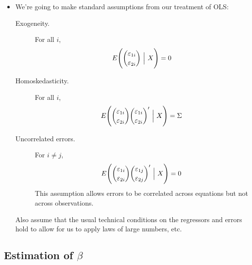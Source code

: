 \begin{itemize}[leftmargin=0pt]
\item We're going to make standard assumptions from our treatment of
  OLS:
  \begin{description}
  \item[Exogeneity.] For all $i$,
    \begin{equation*}
      E\Bigg(\binom{\vep_{1i}}{\vep_{2i}} \ \Big|\ X\Bigg) = 0
    \end{equation*}
  \item[Homoskedasticity.] For all $i$,
    \begin{equation*}
      E\Bigg(\binom{\varepsilon_{1i}}{\varepsilon_{2i}} \binom{\varepsilon_{1i}}{\varepsilon_{2i}}'
      \ \Big|\ X \Bigg) = \Sigma
    \end{equation*}
  \item[Uncorrelated errors.] For $i \neq j$,
    \begin{equation*}
      E\Bigg(\binom{\varepsilon_{1i}}{\varepsilon_{2i}}
      \binom{\varepsilon_{1j}}{\varepsilon_{2j}}' \ \Big|\ X \Bigg) = 0
    \end{equation*}
    This assumption allows errors to be correlated across equations
    but not across observations.
  \end{description}
  
  Also assume that the usual technical conditions on the regressors
  and errors hold to allow for us to apply laws of large numbers, etc.

\end{itemize}

\subsection{Estimation of $\beta$}


